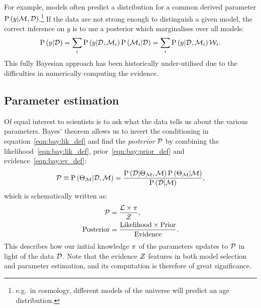 For example, models often predict a distribution for a common derived parameter $\mathrm{P}\left(y\middle|\mathcal{M},\mathcal{D}\right)$.\footnote{e.g.\ in cosmology, different models of the universe will predict an age distribution.} If the data are not strong enough to distinguish a given model, the correct inference on $y$ is to use a posterior which marginalises over all models:
\begin{equation}
  \mathrm{P}\left(y\middle|\mathcal{D}\right) 
  = \sum_i\mathrm{P}\left(y\middle|\mathcal{D},\mathcal{M}_i\right)\mathrm{P}\left(\mathcal{M}_i\middle|\mathcal{D}\right)
  = \sum_i\mathrm{P}\left(y\middle|\mathcal{D},\mathcal{M}_i\right)\mathcal{W}_i.
\end{equation}
This fully Bayesian approach has been historically under-utilised due to the difficulties in numerically computing the evidence.



\subsection{Parameter estimation}
Of equal interest to scientists is to ask what the data tells us about the various parameters.  
Bayes' theorem allows us to invert the conditioning in equation~\eqref{eqn:bay:lik_def} and find the {\em posterior\/} $\mathcal{P}$ by combining the likelihood~\eqref{eqn:bay:lik_def}, prior~\eqref{eqn:bay:prior_def} and evidence~\eqref{eqn:bay:ev_def}:
%
\begin{equation}
  \mathcal{P}\equiv
  \mathrm{P}\left(\Theta_{\mathcal{M}}\middle|\mathcal{D},\mathcal{M}\right) = \frac{\mathrm{P}\left(\mathcal{D}\middle|\Theta_{\mathcal{M}},\mathcal{M}\right) \mathrm{P}\left(\Theta_{\mathcal{M}}\middle|\mathcal{M}\right)}{\mathrm{P}\left(\mathcal{D}\middle|\mathcal{M}\right)},
  \label{eqn:bay:bayes_theorem}
\end{equation}
%
which is schematically written as:
\begin{align}
  \mathcal{P} &= \frac{\mathcal{L} \times \pi }{\mathcal{Z} },
  \label{eqn:bay:bayes_theorem_abbrv}\\
  \mathrm{Posterior} &= \frac{\mathrm{Likelihood} \times \mathrm{Prior} }{\mathrm{Evidence} }.
\end{align}
This describes how our initial knowledge $\pi$ of the parameters updates to $\mathcal{P}$ in light of the data $\mathcal{D}$. Note that the evidence $\mathcal{Z}$ features in both model selection and parameter estimation, and its computation is therefore of great significance.








